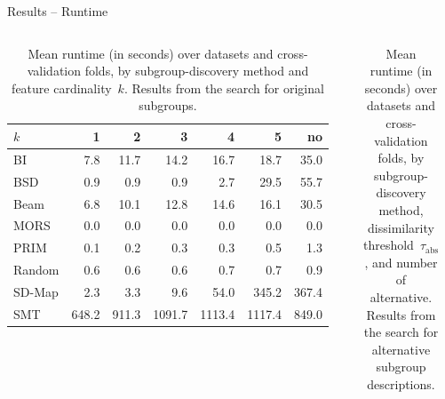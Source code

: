 \documentclass[en, navbaroff, handout]{sdqbeamer}
\begin{document}
\begin{frame}[t]{Results -- Runtime}
	\begin{columns}[T]
		\begin{column}{\kitthreecolumns}
			\begin{table}
				\centering
				\caption*{
					Mean runtime (in seconds) over datasets and cross-validation folds, by subgroup-discovery method and feature cardinality~$k$.
					Results from the search for original subgroups.
				}
				\begin{tabular}{lrrrrrr}
					\toprule
					$k$ & 1 & 2 & 3 & 4 & 5 & no \\
					\midrule
					BI & 7.8 & 11.7 & 14.2 & 16.7 & 18.7 & 35.0 \\
					BSD & 0.9 & 0.9 & 0.9 & 2.7 & 29.5 & 55.7 \\
					Beam & 6.8 & 10.1 & 12.8 & 14.6 & 16.1 & 30.5 \\
					MORS & 0.0 & 0.0 & 0.0 & 0.0 & 0.0 & 0.0 \\
					PRIM & 0.1 & 0.2 & 0.3 & 0.3 & 0.5 & 1.3 \\
					Random & 0.6 & 0.6 & 0.6 & 0.7 & 0.7 & 0.9 \\
					SD-Map & 2.3 & 3.3 & 9.6 & 54.0 & 345.2 & 367.4 \\
					SMT & 648.2 & 911.3 & 1091.7 & 1113.4 & 1117.4 & 849.0 \\
					\bottomrule
				\end{tabular}
				\label{tab:csd:cardinality-runtime}
			\end{table}
		\end{column}
		\begin{column}{\kitthreecolumns}
			\begin{table}[t]
				\centering
				\caption*{
					Mean runtime (in seconds) over datasets and cross-validation folds, by subgroup-discovery method, dissimilarity threshold~$\tau_{\text{abs}}$, and number of alternative.
					Results from the search for alternative subgroup descriptions.
				}
				\begin{tabular}{llrrrrrr}

\end{tabular}
\end{table}
\end{column}
\end{columns}
\end{frame}
\end{document}
